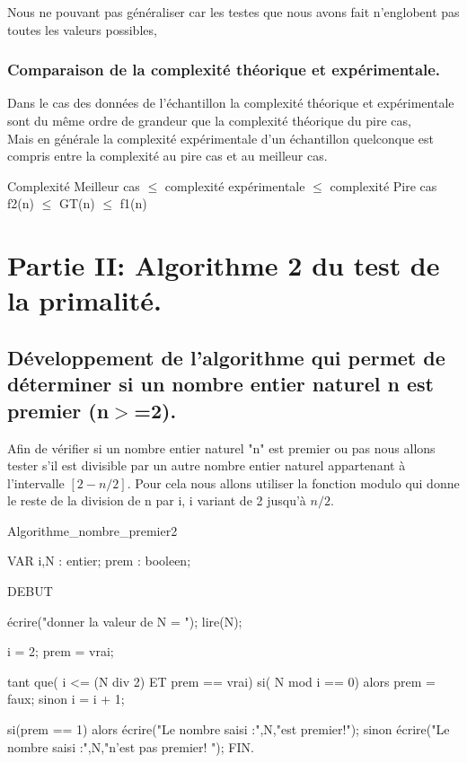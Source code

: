 \documentclass[12pt]{article}
\begin{document}
Nous ne pouvant pas généraliser car les testes que nous avons fait n'englobent pas toutes les valeurs possibles, 
	



\subsubsection{Comparaison de la complexité théorique et expérimentale. }
Dans le cas des données de l'échantillon la complexité théorique et expérimentale sont du même ordre de grandeur que la complexité théorique du pire cas,
\\
Mais en générale la complexité expérimentale d'un échantillon quelconque est compris entre la complexité au pire cas et au meilleur cas.
\\
\begin{center}
\color{blue}
Complexité Meilleur cas $\le$ complexité expérimentale $\le$ complexité Pire cas 
\\
f2(n) $\le$ GT(n) $\le$ f1(n)
\color{black}
\end{center}

\section{Partie II: Algorithme 2 du test de la primalité.}

\subsection{Développement de l'algorithme qui permet de déterminer  si un nombre entier naturel n est premier (n$>$=2). }
Afin de vérifier si un nombre entier naturel "n" est premier ou pas nous allons tester s'il est divisible par un autre nombre entier naturel appartenant à l'intervalle $[2 - n/2]$.
Pour cela nous allons utiliser la fonction modulo qui donne le reste de la division de n par i, i variant de 2 jusqu'à $n/2$.


\begin{sql}

 Algorithme_nombre_premier2

 VAR
 i,N : entier;
 prem : booleen;
 
 DEBUT
 
	écrire("donner la valeur de N = ");
	lire(N);

	i = 2;
	prem = vrai;

	tant que( i <= (N div 2) ET prem == vrai){
		si( N mod i == 0)
			alors 
				prem = faux;				
			sinon
				i = i + 1;
	}

	si(prem == 1)
    	alors
        	écrire("Le nombre saisi :",N,"est premier!");
    	sinon
        	écrire("Le nombre saisi :",N,"n'est pas premier! ");
 FIN. 
\end{sql}
\end{document}

